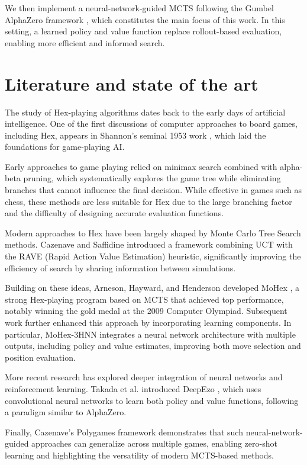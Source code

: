 \documentclass[11pt,a4paper]{article}
\begin{document}
We then implement a neural-network-guided MCTS following the Gumbel AlphaZero framework \cite{danihelka2022policy}, which constitutes the main focus of this work. In this setting, a learned policy and value function replace rollout-based evaluation, enabling more efficient and informed search.

\section{Literature and state of the art}

The study of Hex-playing algorithms dates back to the early days of artificial intelligence. One of the first discussions of computer approaches to board games, including Hex, appears in Shannon’s seminal 1953 work \cite{Shannon1953ComputersAA}, which laid the foundations for game-playing AI.

Early approaches to game playing relied on minimax search combined with alpha-beta pruning, which systematically explores the game tree while eliminating branches that cannot influence the final decision. While effective in games such as chess, these methods are less suitable for Hex due to the large branching factor and the difficulty of designing accurate evaluation functions.

Modern approaches to Hex have been largely shaped by Monte Carlo Tree Search methods. Cazenave and Saffidine \cite{Cazenave2010MonteCarloH} introduced a framework combining UCT with the RAVE (Rapid Action Value Estimation) heuristic, significantly improving the efficiency of search by sharing information between simulations.

Building on these ideas, Arneson, Hayward, and Henderson developed MoHex \cite{mohex_2011}, a strong Hex-playing program based on MCTS that achieved top performance, notably winning the gold medal at the 2009 Computer Olympiad. Subsequent work further enhanced this approach by incorporating learning components. In particular, MoHex-3HNN \cite{ijcai2018p523} integrates a neural network architecture with multiple outputs, including policy and value estimates, improving both move selection and position evaluation.

More recent research has explored deeper integration of neural networks and reinforcement learning. Takada et al. introduced DeepEzo \cite{takada2020reinforcement}, which uses convolutional neural networks to learn both policy and value functions, following a paradigm similar to AlphaZero.

Finally, Cazenave’s Polygames framework \cite{cazenave2020polygamesimprovedzerolearning} demonstrates that such neural-network-guided approaches can generalize across multiple games, enabling zero-shot learning and highlighting the versatility of modern MCTS-based methods.
\end{document}
